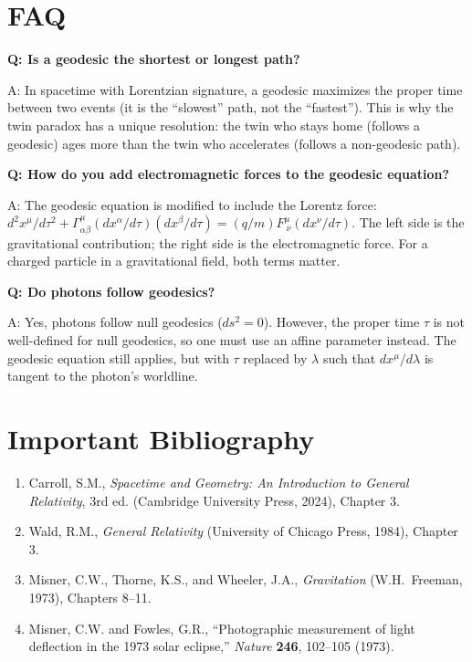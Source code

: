 \documentclass[11pt,openright]{book}
\begin{document}
\section*{FAQ}

\textbf{Q: Is a geodesic the shortest or longest path?}

A: In spacetime with Lorentzian signature, a geodesic maximizes the proper time between two events (it is the ``slowest'' path, not the ``fastest''). This is why the twin paradox has a unique resolution: the twin who stays home (follows a geodesic) ages more than the twin who accelerates (follows a non-geodesic path).

\textbf{Q: How do you add electromagnetic forces to the geodesic equation?}

A: The geodesic equation is modified to include the Lorentz force: $d^2 x^\mu/d\tau^2 + \Gamma^\mu_{\alpha\beta}(dx^\alpha/d\tau)(dx^\beta/d\tau) = (q/m)F^\mu_{\ \nu}(dx^\nu/d\tau)$. The left side is the gravitational contribution; the right side is the electromagnetic force. For a charged particle in a gravitational field, both terms matter.

\textbf{Q: Do photons follow geodesics?}

A: Yes, photons follow null geodesics ($ds^2 = 0$). However, the proper time $\tau$ is not well-defined for null geodesics, so one must use an affine parameter instead. The geodesic equation still applies, but with $\tau$ replaced by $\lambda$ such that $dx^\mu/d\lambda$ is tangent to the photon's worldline.
\section*{Important Bibliography}

\begin{enumerate}
\item Carroll, S.M., \textit{Spacetime and Geometry: An Introduction to General Relativity}, 3rd ed. (Cambridge University Press, 2024), Chapter 3.
\item Wald, R.M., \textit{General Relativity} (University of Chicago Press, 1984), Chapter 3.
\item Misner, C.W., Thorne, K.S., and Wheeler, J.A., \textit{Gravitation} (W.H.\ Freeman, 1973), Chapters 8--11.
\item Misner, C.W. and Fowles, G.R., ``Photographic measurement of light deflection in the 1973 solar eclipse,'' \textit{Nature} \textbf{246}, 102--105 (1973).
\end{enumerate}
\end{document}
